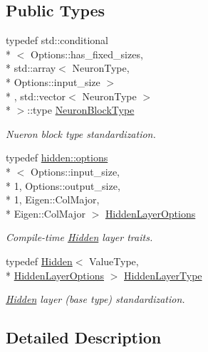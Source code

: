 \subsection*{Public Types}
\begin{DoxyCompactItemize}
\item 
typedef std\-::conditional\\*
$<$ Options\-::has\-\_\-fixed\-\_\-sizes, \\*
std\-::array$<$ Neuron\-Type, \\*
Options\-::input\-\_\-size $>$\\*
, std\-::vector$<$ Neuron\-Type $>$\\*
 $>$\-::type \hyperlink{structffnn_1_1layer_1_1activation_1_1extrinsics_a3bd0eb92b3368bfef1fead81906baa89}{Neuron\-Block\-Type}
\begin{DoxyCompactList}\small\item\em Nueron block type standardization. \end{DoxyCompactList}\item 
typedef \hyperlink{structffnn_1_1layer_1_1hidden_1_1options}{hidden\-::options}\\*
$<$ Options\-::input\-\_\-size, \\*
1, Options\-::output\-\_\-size, \\*
1, Eigen\-::\-Col\-Major, \\*
Eigen\-::\-Col\-Major $>$ \hyperlink{structffnn_1_1layer_1_1activation_1_1extrinsics_a879a4e29c3e7ff05ccc1d8a967230bb5}{Hidden\-Layer\-Options}
\begin{DoxyCompactList}\small\item\em Compile-\/time \hyperlink{classffnn_1_1layer_1_1_hidden}{Hidden} layer traits. \end{DoxyCompactList}\item 
typedef \hyperlink{classffnn_1_1layer_1_1_hidden}{Hidden}$<$ Value\-Type, \\*
\hyperlink{structffnn_1_1layer_1_1activation_1_1extrinsics_a879a4e29c3e7ff05ccc1d8a967230bb5}{Hidden\-Layer\-Options} $>$ \hyperlink{structffnn_1_1layer_1_1activation_1_1extrinsics_abdfd375dd1e57312be2298b48ab00851}{Hidden\-Layer\-Type}
\begin{DoxyCompactList}\small\item\em \hyperlink{classffnn_1_1layer_1_1_hidden}{Hidden} layer (base type) standardization. \end{DoxyCompactList}\end{DoxyCompactItemize}


\subsection{Detailed Description}
